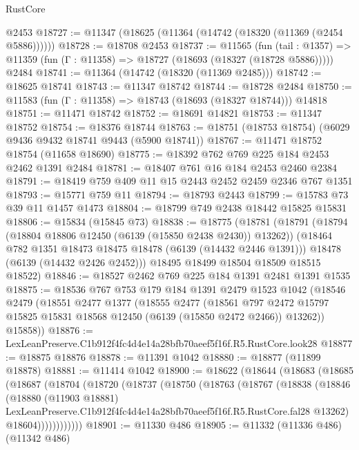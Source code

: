 \begin{lexlean}{RustCore}
\begin{coremodule}
    @2453
@18727 := @11347 (@18625 (@11364 (@14742 (@18320 (@11369 (@2454 @5886))))))
@18728 := @18708 @2453
@18737 := @11565
    (fun (tail : @1357) => @11359 (fun (Γ : @11358) => @18727 (@18693 (@18327 (@18728 @5886)))))
    @2484
@18741 := @11364 (@14742 (@18320 (@11369 @2485)))
@18742 := @18625 @18741
@18743 := @11347 @18742
@18744 := @18728 @2484
@18750 := @11583 (fun (Γ : @11358) => @18743 (@18693 (@18327 @18744))) @14818
@18751 := @11471 @18742
@18752 := @18691 @14821
@18753 := @11347 @18752
@18754 := @18376 @18744
@18763 := @18751 (@18753 @18754) (@6029 @9436 @9432 @18741 @9443 (@5900 @18741))
@18767 := @11471 @18752 @18754 (@11658 @18690)
@18775 := @18392 @762 @769 @225 @184 @2453 @2462 @1391 @2484
@18781 := @18407 @761 @16 @184 @2453 @2460 @2384
@18791 := @18419 @759 @409 @11 @15 @2443 @2452 @2459 @2346 @767 @1351
@18793 := @15771 @759 @11
@18794 := @18793 @2443
@18799 := @15783 @73 @39 @11 @1457 @1473
@18804 := @18799 @749 @2438 @18442 @15825 @15831
@18806 := @15834 (@15845 @73)
@18838 := @18775
    (@18781
      (@18791
        (@18794 (@18804 @18806 @12450 (@6139 (@15850 @2438 @2430)) @13262))
        (@18464 @782 @1351 @18473 @18475 @18478 (@6139 (@14432 @2446 @1391)))
        @18478
        (@6139 (@14432 @2426 @2452)))
      @18495
      @18499
      @18504
      @18509
      @18515
      @18522)
@18846 := @18527 @2462 @769 @225 @184 @1391 @2481 @1391 @1535
@18875 := @18536
    @767
    @753
    @179
    @184
    @1391
    @2479
    @1523
    @1042
    (@18546
      @2479
      (@18551
        @2477
        @1377
        (@18555
          @2477
          (@18561
            @797
            @2472
            @15797
            @15825
            @15831
            @18568
            @12450
            (@6139 (@15850 @2472 @2466))
            @13262))
        @15858))
@18876 := LexLeanPreserve.C1b912f4fc4d4e14a28bfb70aeef5f16f.R5.RustCore.look28
@18877 := @18875 @18876
@18878 := @11391 @1042
@18880 := @18877 (@11899 @18878)
@18881 := @11414 @1042
@18900 := @18622
    (@18644
      (@18683
        (@18685
          (@18687
            (@18704
              (@18720
                (@18737
                  (@18750
                    (@18763
                      (@18767
                        (@18838
                          (@18846
                            (@18880
                              (@11903 @18881)
                              LexLeanPreserve.C1b912f4fc4d4e14a28bfb70aeef5f16f.R5.RustCore.fal28
                              @13262)
                            @18604))))))))))))
@18901 := @11330 @486
@18905 := @11332 (@11336 @486) (@11342 @486)

\end{coremodule}
\end{lexlean}
